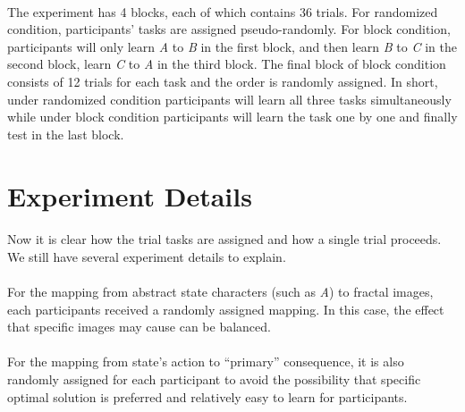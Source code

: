 \paragraph{}
The experiment has 4 blocks, each of which contains 36 trials. 
For randomized condition, participants' tasks are assigned pseudo-randomly. For block condition, participants will only learn \emph{A} to \emph{B} in the first block, and then learn \emph{B} to \emph{C} in the second block, learn \emph{C} to \emph{A} in the third block. The final block of block condition consists of 12 trials for each task and the order is randomly assigned. In short, under randomized condition participants will learn all three tasks simultaneously while under block condition participants will learn the task one by one and finally test in the last block. 


\section{Experiment Details}
\label{sec:Experiment Details}
\paragraph{}
Now it is clear how the trial tasks are assigned and how a single trial proceeds. We still have several experiment details to explain. 
\paragraph{}
For the mapping from abstract state characters (such as \emph{A}) to fractal images, each participants received a randomly assigned mapping. In this case, the effect that specific images may cause can be balanced. 
\paragraph{}
For the mapping from state's action to \enquote{primary} consequence, it is also randomly assigned for each participant to avoid the possibility that specific optimal solution is preferred and relatively easy to learn for participants. 
